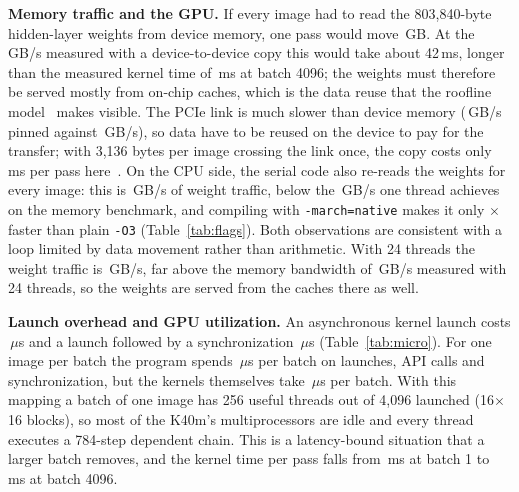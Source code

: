 \textbf{Memory traffic and the GPU.} If every image had to read the 803{,}840-byte hidden-layer weights from device memory, one pass would move \,GB. At the \,GB/s measured with a device-to-device copy this would take about 42\,ms, longer than the measured kernel time of \,ms at batch 4096; the weights must therefore be served mostly from on-chip caches, which is the data reuse that the roofline model~\cite{williams2009roofline} makes visible. The PCIe link is much slower than device memory (\,GB/s pinned against \,GB/s), so data have to be reused on the device to pay for the transfer; with 3{,}136 bytes per image crossing the link once, the copy costs only \,ms per pass here~\cite{gregg2011data,harris2012transfers}. On the CPU side, the serial code also re-reads the weights for every image: this is \,GB/s of weight traffic, below the \,GB/s one thread achieves on the memory benchmark, and compiling with \texttt{-march=native} makes it only $\times$ faster than plain \texttt{-O3} (Table~\ref{tab:flags}). Both observations are consistent with a loop limited by data movement rather than arithmetic. With 24 threads the weight traffic is \,GB/s, far above the memory bandwidth of \,GB/s measured with 24 threads, so the weights are served from the caches there as well.

\textbf{Launch overhead and GPU utilization.} An asynchronous kernel launch costs \,$\mu$s and a launch followed by a synchronization \,$\mu$s (Table~\ref{tab:micro}). For one image per batch the program spends \,$\mu$s per batch on launches, API calls and synchronization, but the kernels themselves take \,$\mu$s per batch. With this mapping a batch of one image has 256 useful threads out of 4{,}096 launched (16$\times$16 blocks), so most of the K40m's multiprocessors are idle and every thread executes a 784-step dependent chain. This is a latency-bound situation that a larger batch removes, and the kernel time per pass falls from \,ms at batch 1 to \,ms at batch 4096.


